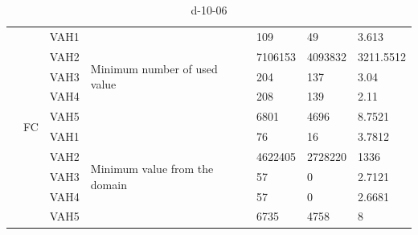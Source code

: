 \documentclass[14pt]{scrartcl} %
\begin{document}
\begin{table}[ht]
{\begin{tabular}{|l|l|l|l|l|l|l|}
                          & \multirow{10}{*}{FC} & VAH1 & \multirow{5}{*}{Minimum number of used value}  &   109     &  49           &    3.613         \\ \cline{3-3} \cline{5-7} 
                          &                      & VAH2 &                                                &  7106153      &  4093832            &           3211.5512  \\ \cline{3-3} \cline{5-7} 
                          &                      & VAH3 &                                                &   204     &         137    & 3.04            \\ \cline{3-3} \cline{5-7} 
                          &                      & VAH4 &                                                &   208     &        139     & 2.11            \\ \cline{3-3} \cline{5-7} 
                          &                      & VAH5 &                                                &  6801      &   4696          &          8.7521   \\ \cline{3-7} 
                          &                      & VAH1 & \multirow{5}{*}{Minimum value from the domain} &  76      &     16        &       3.7812      \\ \cline{3-3} \cline{5-7} 
                          &                      & VAH2 &                                                &  4622405      &     2728220        &  1336           \\ \cline{3-3} \cline{5-7} 
 \rowcolor{yellow}                           &                      & VAH3 &                                                &  57      &  0           &   2.7121          \\ \cline{3-3} \cline{5-7} 
 \rowcolor{green}                         &                      & VAH4 &                                                &  57      &   0          &      2.6681       \\ \cline{3-3} \cline{5-7} 
                          &                      & VAH5 &                                                &  6735      &          4758   &   8          \\ \hline
\end{tabular}
}
\caption{d-10-06}
\end{table}
\end{document}
